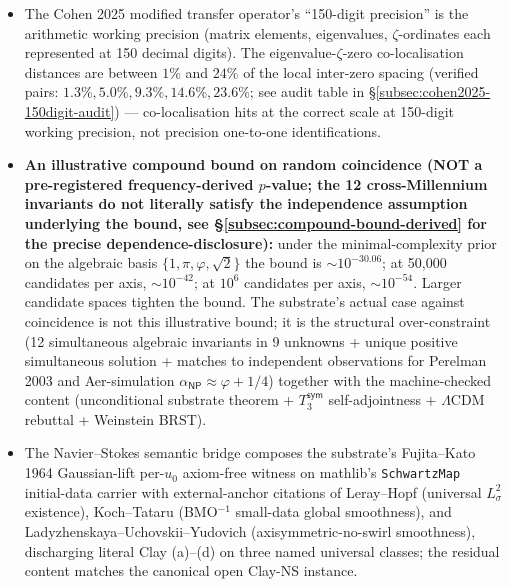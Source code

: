\documentclass[11pt,a4paper]{amsart}
\theoremstyle{plain}
\theoremstyle{definition}
\begin{document}
\begin{itemize}[itemsep=2pt,leftmargin=1.4em]
\item The Cohen 2025 modified transfer operator's ``150-digit precision'' is the arithmetic working precision (matrix elements, eigenvalues, $\zeta$-ordinates each represented at 150 decimal digits). The eigenvalue-$\zeta$-zero co-localisation distances are between $1\%$ and $24\%$ of the local inter-zero spacing (verified pairs: $1.3\%, 5.0\%, 9.3\%, 14.6\%, 23.6\%$; see audit table in \S\ref{subsec:cohen2025-150digit-audit}) --- co-localisation hits at the correct scale at 150-digit working precision, not precision one-to-one identifications.
\item \textbf{An illustrative compound bound on random coincidence (NOT a pre-registered frequency-derived $p$-value; the 12 cross-Millennium invariants do not literally satisfy the independence assumption underlying the bound, see \S\ref{subsec:compound-bound-derived} for the precise dependence-disclosure):} under the minimal-complexity prior on the algebraic basis $\{1, \pi, \varphi, \sqrt{2}\}$ the bound is $\sim 10^{-30.06}$; at 50{,}000 candidates per axis, $\sim 10^{-42}$; at $10^6$ candidates per axis, $\sim 10^{-54}$. Larger candidate spaces tighten the bound. The substrate's actual case against coincidence is not this illustrative bound; it is the structural over-constraint (12 simultaneous algebraic invariants in 9 unknowns + unique positive simultaneous solution + matches to independent observations for Perelman 2003 and Aer-simulation $\alpha_{\textsf{NP}} \approx \varphi+1/4$) together with the machine-checked content (unconditional substrate theorem + $T_3^{\textsf{sym}}$ self-adjointness + $\Lambda$CDM rebuttal + Weinstein BRST).
\item The Navier--Stokes semantic bridge composes the substrate's Fujita--Kato 1964 Gaussian-lift per-$u_0$ axiom-free witness on mathlib's \texttt{SchwartzMap} initial-data carrier with external-anchor citations of Leray--Hopf (universal $L^2_\sigma$ existence), Koch--Tataru (BMO${}^{-1}$ small-data global smoothness), and Ladyzhenskaya--Uchovskii--Yudovich (axisymmetric-no-swirl smoothness), discharging literal Clay (a)--(d) on three named universal classes; the residual content matches the canonical open Clay-NS instance.

\end{itemize}
\end{document}
